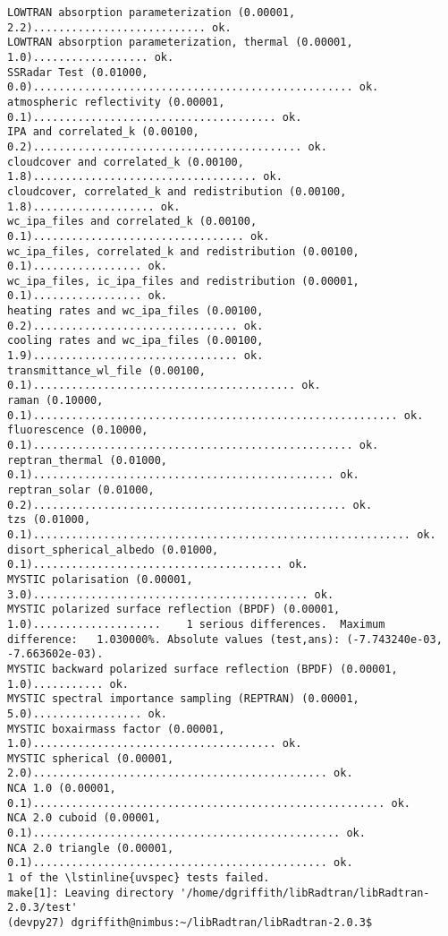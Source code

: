 \begin{enumerate}
\begin{lstlisting}[style=tinysize]
LOWTRAN absorption parameterization (0.00001,   2.2)........................... ok.
LOWTRAN absorption parameterization, thermal (0.00001,   1.0).................. ok.
SSRadar Test (0.01000,   0.0).................................................. ok.
atmospheric reflectivity (0.00001,   0.1)...................................... ok.
IPA and correlated_k (0.00100,   0.2).......................................... ok.
cloudcover and correlated_k (0.00100,   1.8)................................... ok.
cloudcover, correlated_k and redistribution (0.00100,   1.8)................... ok.
wc_ipa_files and correlated_k (0.00100,   0.1)................................. ok.
wc_ipa_files, correlated_k and redistribution (0.00100,   0.1)................. ok.
wc_ipa_files, ic_ipa_files and redistribution (0.00001,   0.1)................. ok.
heating rates and wc_ipa_files (0.00100,   0.2)................................ ok.
cooling rates and wc_ipa_files (0.00100,   1.9)................................ ok.
transmittance_wl_file (0.00100,   0.1)......................................... ok.
raman (0.10000,   0.1)......................................................... ok.
fluorescence (0.10000,   0.1).................................................. ok.
reptran_thermal (0.01000,   0.1)............................................... ok.
reptran_solar (0.01000,   0.2)................................................. ok.
tzs (0.01000,   0.1)........................................................... ok.
disort_spherical_albedo (0.01000,   0.1)....................................... ok.
MYSTIC polarisation (0.00001,   3.0)........................................... ok.
MYSTIC polarized surface reflection (BPDF) (0.00001,   1.0)....................    1 serious differences.  Maximum difference:   1.030000%. Absolute values (test,ans): (-7.743240e-03, -7.663602e-03).
MYSTIC backward polarized surface reflection (BPDF) (0.00001,   1.0)........... ok.
MYSTIC spectral importance sampling (REPTRAN) (0.00001,   5.0)................. ok.
MYSTIC boxairmass factor (0.00001,   1.0)...................................... ok.
MYSTIC spherical (0.00001,   2.0).............................................. ok.
NCA 1.0 (0.00001,   0.1)....................................................... ok.
NCA 2.0 cuboid (0.00001,   0.1)................................................ ok.
NCA 2.0 triangle (0.00001,   0.1).............................................. ok.
1 of the \lstinline{uvspec} tests failed.
make[1]: Leaving directory '/home/dgriffith/libRadtran/libRadtran-2.0.3/test'
(devpy27) dgriffith@nimbus:~/libRadtran/libRadtran-2.0.3$
\end{lstlisting}


\end{enumerate}
